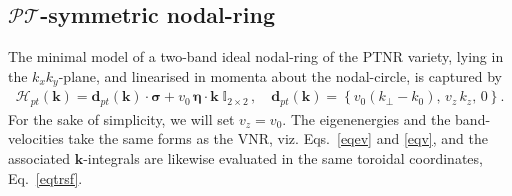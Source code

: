 \documentclass[aps,prb,onecolumn,nofootinbib,citeautoscript,10pt]{revtex4-2}
\newcommand{\bs}[1]{\boldsymbol{#1}}
\def \nn{\nonumber \\}
\begin{document}


\subsection{${\mathcal P} {\mathcal T}$-symmetric nodal-ring}
\label{secptnr}

The minimal model of a two-band ideal nodal-ring of the PTNR variety, lying in the $k_x k_y$-plane, and linearised in momenta about the nodal-circle, is captured by \cite{balents-nodal, yang1, ips-nlsm-ph, ips-gnr-strain}
\begin{align}
\mathcal{H}_{pt} (\bs k ) = {\bs d}_{pt} (\bs k) \cdot \boldsymbol{\sigma}  
+  v_0 \,{\bs \eta} \cdot {\bs k}\; \mathbb{I}_{2\times 2}\,,
\quad {\bs d}_{pt} (\bs k) 
=
\left \lbrace v_0  \left( k_\perp - k_0 \right) , \, v_z \, k_z ,\, 0 \right \rbrace .
\end{align}
For the sake of simplicity, we will set $v_z = v_0$. The eigenenergies and the band-velocities take the same forms as the VNR, viz. Eqs.~\eqref{eqev} and \eqref{eqv}, and the associated $\bs k$-integrals are likewise evaluated in the same toroidal coordinates, Eq.~\eqref{eqtrsf}.
\end{document}
